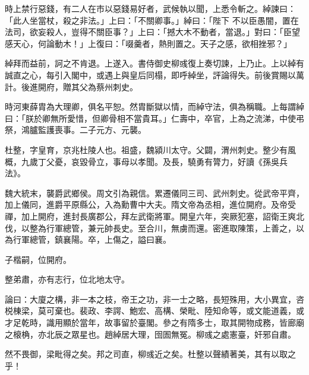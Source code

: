 \begin{pinyinscope}
 時上禁行惡錢，有二人在市以惡錢易好者，武候執以聞，上悉令斬之。綽諫曰：「此人坐當杖，殺之非法。」上曰：「不關卿事。」綽曰：「陛下
 不以臣愚闇，置在法司，欲妄殺人，豈得不關臣事？」上曰：「撼大木不動者，當退。」對曰：「臣望感天心，何論動木！」上復曰：「啜羹者，熱則置之。天子之感，欲相挫邪？」



 綽拜而益前，訶之不肯退。上遂入。書侍御史柳彧復上奏切諫，上乃止。上以綽有誠直之心，每引入閣中，或遇上與皇后同榻，即呼綽坐，評論得失。前後賞賜以萬計。後進開府，贈其父為蔡州刺史。



 時河東薛胄為大理卿，俱名平恕。然胄斷獄以情，而綽守法，俱為稱職。上每謂綽曰：「朕於卿無所愛惜，但卿骨相不當貴耳。」仁壽中，卒官，上為之流涕，中使弔祭，鴻臚監護喪事。二子元方、元襲。



 杜整，字皇育，京兆杜陵人也。祖盛，魏潁川太守。父闢，渭州刺史。整少有風概，九歲丁父憂，哀毀骨立，事母以孝聞。及長，驍勇有膂力，好讀《孫吳兵法》。



 魏大統末，襲爵武鄉侯。周文引為親信。累遷儀同三司、武州刺史。從武帝平齊，加上儀同，進爵平原縣公，入為勳曹中大夫。隋文帝為丞相，進位開府。及帝受禪，加上開府，進封長廣郡公，拜左武衛將軍。開皇六年，突厥犯塞，詔衛王爽北伐，以整為行軍總管，兼元帥長史。至合川，無虜而還。密進取陳策，上善之，以為行軍總管，鎮襄陽。卒，上傷之，謚曰襄。



 子楷嗣，位開府。



 整弟肅，亦有志行，位北地太守。



 論曰：大廈之構，非一本之枝，帝王之功，非一士之略，長短殊用，大小異宜，咨棁棟梁，莫可棄也。裴政、李諤、鮑宏、高構、榮毗、陸知命等，或文能道義，或才足乾時，識用顯於當年，故事留於臺閣。參之有隋多士，取其開物成務，皆廊廟之榱桷，亦北辰之眾星也。趙綽居大理，囹圄無冤。柳彧之處憲臺，奸邪自肅。



 然不畏御，梁毗得之矣。邦之司直，柳彧近之矣。杜整以聲績著美，其有以取之乎！



\end{pinyinscope}